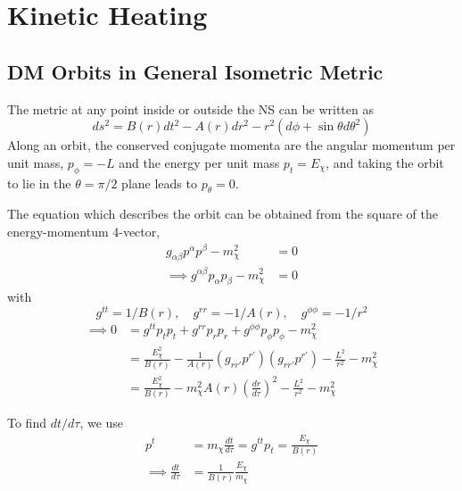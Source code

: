 \chapter{Kinetic Heating}
\label{appendix:kin_heating}

\section{DM Orbits in General Isometric Metric}

The metric at any point inside or outside the NS can be written as 
\begin{equation}
    ds^2 = B(r) dt^2 - A(r) dr^2 - r^2( d\phi + \sin\theta d\theta^2)
\end{equation}
Along an orbit, the conserved conjugate momenta are the angular momentum per unit mass, $p_\phi = -L$ 
and the energy per unit mass $p_t = E_\chi$, and taking the orbit to lie in the $\theta = \pi/2$ plane 
leads to $p_\theta = 0$. 

The equation which describes the orbit can be obtained from the square of the energy-momentum 4-vector,
\begin{align}
    g_{\alpha\beta} p^\alpha p^\beta - m_\chi^2 & = 0\\
    \implies g^{\alpha\beta} p_\alpha p_\beta - m_\chi^2 & = 0
\end{align}
with
\begin{equation}    
g^{tt} = 1/B(r),\quad g^{rr} = -1/A(r),\quad g^{\phi \phi} = -1/r^2
\end{equation}
\begin{align}
    \implies 0 & = g^{tt} p_t p_t + g^{rr} p_r p_r + g^{\phi\phi} p_\phi p_\phi - m_\chi^2 \\
    & = \frac{E_\chi^2}{B(r)} - \frac{1}{A(r)} \left( g_{rr'} p^{r'} \right)\left( g_{rr'} p^{r'} \right) - \frac{L^2}{r^2} - m_\chi^2 \\
    & = \frac{E_\chi^2}{B(r)} - m_\chi^2 A(r) \left( \frac{dr}{d\tau} \right)^2 - \frac{L^2}{r^2} - m_\chi^2
\end{align}

To find $dt/d\tau$, we use
\begin{align}
    p^t & = m_\chi \frac{dt}{d\tau} = g^{tt}p_t = \frac{E_\chi}{B(r)}\\
    \implies \frac{dt}{d\tau} & = \frac{1}{B(r)}\frac{E_\chi}{m_\chi}
\end{align}

